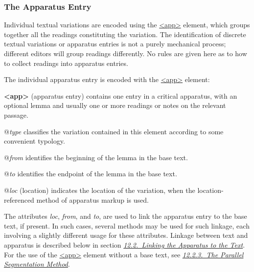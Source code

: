 \subsubsection[{The Apparatus Entry}]{The Apparatus Entry}\label{TCAPEN}\par
Individual textual variations are encoded using the \hyperref[TEI.app]{<app>} element, which groups together all the readings constituting the variation. The identification of discrete textual variations or apparatus entries is not a purely mechanical process; different editors will group readings differently. No rules are given here as to how to collect readings into apparatus entries.\par
The individual apparatus entry is encoded with the \hyperref[TEI.app]{<app>} element: 
\begin{sansreflist}
  
\item [\textbf{<app>}] (apparatus entry) contains one entry in a critical apparatus, with an optional lemma and usually one or more readings or notes on the relevant passage.\hfil\\[-10pt]\begin{sansreflist}
    \item[@{\itshape type}]
  classifies the variation contained in this element according to some convenient typology.
    \item[@{\itshape from}]
  identifies the beginning of the lemma in the base text.
    \item[@{\itshape to}]
  identifies the endpoint of the lemma in the base text.
    \item[@{\itshape loc}]
  (location) indicates the location of the variation, when the location-referenced method of apparatus markup is used.
\end{sansreflist}  
\end{sansreflist}
\par
The attributes {\itshape loc}, {\itshape from}, and {\itshape to}, are used to link the apparatus entry to the base text, if present. In such cases, several methods may be used for such linkage, each involving a slightly different usage for these attributes. Linkage between text and apparatus is described below in section \textit{\hyperref[TCAPLK]{12.2.\ Linking the Apparatus to the Text}}. For the use of the \hyperref[TEI.app]{<app>} element without a base text, see \textit{\hyperref[TCAPPS]{12.2.3.\ The Parallel Segmentation Method}}.\par
